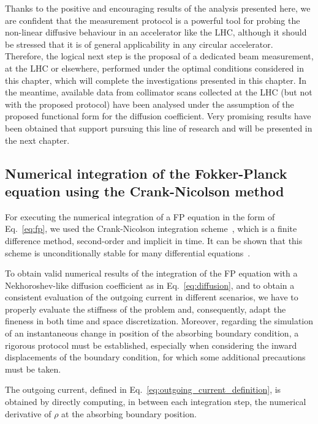 {Thanks to the positive and encouraging results of the analysis presented here, we are confident that the measurement protocol is a powerful tool for probing the non-linear diffusive behaviour in an accelerator like the LHC, although it should be stressed that it is of general applicability in any circular accelerator. Therefore, the logical next step is the proposal of a dedicated beam measurement, at the LHC or elsewhere, performed under the optimal conditions considered in this chapter, which will complete the investigations presented in this chapter. In the meantime, available data from collimator scans collected at the LHC (but not with the proposed protocol) have been analysed under the assumption of the proposed functional form for the diffusion coefficient. Very promising results have been obtained that support pursuing this line of research and will be presented in the next chapter.

\begin{chapterappendices}
\subsection{Numerical integration of the Fokker-Planck equation using the Crank-Nicolson method} \label{app_sec:numerical_integration_with_crank_nicolson}


For executing the numerical integration of a FP equation in the form of Eq.~\eqref{eq:fp}, we used the Crank-Nicolson integration scheme~\cite{crank1947practical}, which is a finite difference method, second-order and implicit in time. It can be shown that this scheme is unconditionally stable for many differential equations~\cite{thomas2013numerical}.

To obtain valid numerical results of the integration of the FP equation with a Nekhoroshev-like diffusion coefficient as in Eq.~\eqref{eq:diffusion}, and to obtain a consistent evaluation of the outgoing current in different scenarios, we have to properly evaluate the stiffness of the problem and, consequently, adapt the fineness in both time and space discretization. Moreover, regarding the simulation of an instantaneous change in position of the absorbing boundary condition, a rigorous protocol must be established, especially when considering the inward displacements of the boundary condition, for which some additional precautions must be taken.

The outgoing current, defined in Eq.~\eqref{eq:outgoing_current_definition}, is obtained by directly computing, in between each integration step, the numerical derivative of $\rho$ at the absorbing boundary position. 


\end{chapterappendices}}
